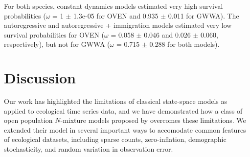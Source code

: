 \documentclass[12pt]{article}
\begin{document}
For both species, constant dynamics models estimated very high
survival probabilities ($\omega$ = 1 $\pm$ 1.3e-05 for OVEN and 0.935 $\pm$ 0.011 for
GWWA).   The autoregressive and autoregressive + immigration models
estimated very low survival probabilities for OVEN ($\omega$ = 0.058 $\pm$ 0.046
and 0.026 $\pm$ 0.060, respectively), but not for GWWA ($\omega$ = 0.715 $\pm$ 0.288
for both models).




\section{Discussion}

Our work has highlighted the limitations of classical state-space
models as applied to ecological time series data, and we have
demonstrated how a class of open population $N$-mixture models
proposed by \citet{dail_madsen:2011} overcomes these
limitations. We extended their model in several important
ways to accomodate common features of ecological
datasets, including sparse counts, zero-inflation, demographic
stochasticity, and random variation in observation error.
\end{document}
